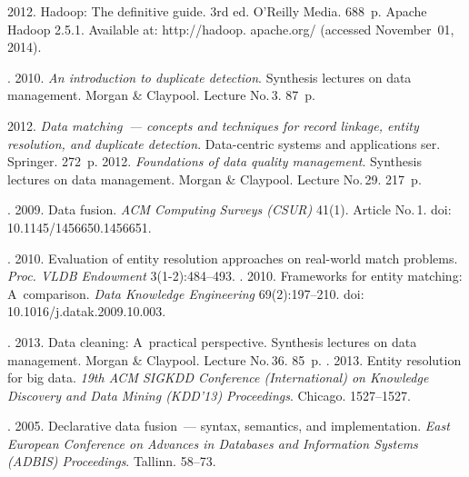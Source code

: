   \begin{multicols}{2}

\renewcommand{\bibname}{\protect\rmfamily References}



{\small\frenchspacing
 {%
 \begin{thebibliography}{99}


 2012. Hadoop: The definitive guide. 3rd ed.
O'Reilly Media. 688~p.
Apache Hadoop 2.5.1. Available at: {\sf http://hadoop. apache.org/}
(accessed November~01, 2014).

. 2010.
\textit{An introduction to duplicate detection}.
Synthesis lectures on data management.  Morgan \& Claypool. Lecture No.\,3. 87~p.

 2012.
\textit{Data matching~--- concepts and techniques for record linkage, entity resolution,
and duplicate detection}. {Data-centric systems and applications} ser.
Springer. 272~p.
 2012. \textit{Foundations of data quality management}.
Synthesis lectures on data management.
Morgan \& Claypool. Lecture No.\,29. 217~p.

. 2009.
Data fusion. \textit{ACM Computing Surveys (CSUR)} 41(1). Article No.\,1.
doi: 10.1145/1456650.1456651.

.
2010. Evaluation of entity resolution approaches on real-world match problems.
\textit{Proc. VLDB Endowment} 3(1-2):484--493.
. 2010. Frameworks for
entity matching: A~comparison. \textit{Data Knowledge Engineering} 69(2):197--210.
doi: 10.1016/j.datak.2009.10.003.

. 2013. Data cleaning: A~practical perspective.
{Synthesis lectures on data management}.  Morgan \& Claypool.
Lecture No.\,36. 85~p.
.
2013. Entity resolution for big data. \textit{19th ACM SIGKDD
Conference (International) on Knowledge Discovery and Data Mining (KDD'13)
Proceedings}. Chicago. 1527--1527.

. 2005. Declarative data fusion~---
syntax, semantics, and implementation. \textit{East European Conference on
Advances in Databases and Information Systems (ADBIS) Proceedings}. Tallinn. 58--73.



\end{thebibliography}}}
\end{multicols}
